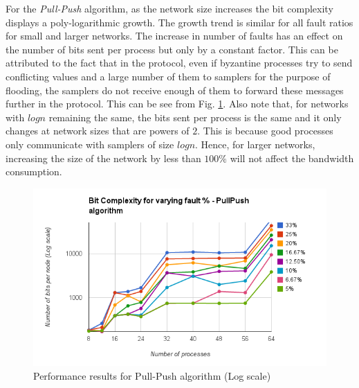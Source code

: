 For the \textit{Pull-Push} algorithm, as the network size increases the bit complexity displays a poly-logarithmic growth. The growth trend is similar for all fault ratios for small and larger networks. The increase in number of faults has an effect on the number of bits sent per process but only by a constant factor. This can be attributed to the fact that in the protocol, even if byzantine processes try to send conflicting values and a large number of them to samplers for the purpose of flooding, the samplers do not receive enough of them to forward these messages further in the protocol. This can be see from Fig. \ref{fig:pull_push}. Also note that, for networks with $logn$ remaining the same, the bits sent per process is the same and it only changes at network sizes that are powers of $2$. This is because good processes only communicate with samplers of size $logn$. Hence, for larger networks, increasing the size of the network by less than $100\%$ will not affect the bandwidth consumption.
\begin{figure}[ht]
 \centering
\includegraphics[scale=0.4]{pull_push}
\caption{Performance results for Pull-Push algorithm (Log scale)}
 \label{fig:pull_push}
\end{figure}

